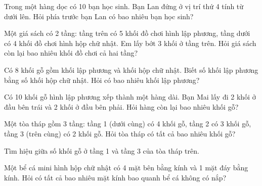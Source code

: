 \begin{ex}
Trong một hàng dọc có 10 bạn học sinh. Bạn Lan đứng ở vị trí thứ 4 tính từ dưới lên. Hỏi phía trước bạn Lan có bao nhiêu bạn học sinh?
\end{ex}

\begin{ex}
Một giá sách có 2 tầng: tầng trên có 5 khối đồ chơi hình lập phương, tầng dưới có 4 khối đồ chơi hình hộp chữ nhật. Em lấy bớt 3 khối ở tầng trên. Hỏi giá sách còn lại bao nhiêu khối đồ chơi cả hai tầng?
\end{ex}

\begin{ex}
Có 8 khối gỗ gồm khối lập phương và khối hộp chữ nhật. Biết số khối lập phương bằng số khối hộp chữ nhật. Hỏi có bao nhiêu khối lập phương?
\end{ex}

\begin{ex}
Có 10 khối gỗ hình lập phương xếp thành một hàng dài. Bạn Mai lấy đi 2 khối ở đầu bên trái và 2 khối ở đầu bên phải. Hỏi hàng còn lại bao nhiêu khối gỗ?
\end{ex}

\begin{ex}
Một tòa tháp gồm 3 tầng: tầng 1 (dưới cùng) có 4 khối gỗ, tầng 2 có 3 khối gỗ, tầng 3 (trên cùng) có 2 khối gỗ. Hỏi tòa tháp có tất cả bao nhiêu khối gỗ?
\end{ex}

\begin{ex}
Tìm hiệu giữa số khối gỗ ở tầng 1 và tầng 3 của tòa tháp trên.
\end{ex}

\begin{ex}
Một bể cá mini hình hộp chữ nhật có 4 mặt bên bằng kính và 1 mặt đáy bằng kính. Hỏi có tất cả bao nhiêu mặt kính bao quanh bể cá không có nắp?
\end{ex}

